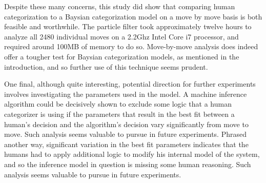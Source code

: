 Despite these many concerns, this study did show that comparing human
categorization to a Baysian categorization model on a move by move basis is both
feasible and worthwhile.  The particle filter took approximately twelve hours to
analyze all 2480 individual moves on a 2.2Ghz Intel Core i7 processor, and
required around 100MB of memory to do so. Move-by-move analysis does indeed
offer a tougher test for Baysian categorization models, as mentioned in the
introduction, and so further use of this technique seems prudent.

One final, although quite interesting, potential direction for further
experiments involves investigating the parameters used in the model. 
A machine inference algorithm could be decisively shown to exclude some logic that a human
categorizer is using if the parameters that result in the best fit between a
human's decision and the algorithm's decision vary significantly from move to move.
Such analysis seems valuable to pursue in future experiments. Phrased
another way, significant variation in the best fit parameters indicates that the
humans had to apply additional logic to modify his internal model of the
system, and so the inference model in question is missing some human reasoning.
Such analysis seems valuable to pursue in future experiments.
